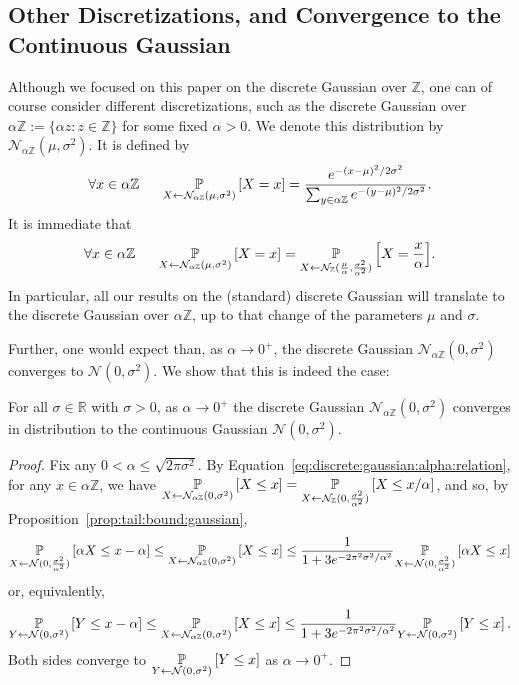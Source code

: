 \documentclass{jpc}
\newcommand{\discparamN}[1]{\mathcal{N}_{#1\Z}}
\newcommand{\pr}[2]{{\ifx&#1& \mathbb{P} \else
\underset{#1}{\mathbb{P}} \fi \left[#2\right]}}
\newcommand{\Z}{\mathbb{Z}}
\newcommand{\R}{\mathbb{R}}
\begin{document}
\subsection{Other Discretizations, and Convergence to the Continuous Gaussian}
\label{sec:other-discs}
Although we focused on this paper on the discrete Gaussian over $\Z$, one can of course consider different discretizations, such as the discrete Gaussian over $\alpha\Z := \{\alpha z : z \in \Z \}$ for some fixed $\alpha>0$. We denote this distribution by $\discparamN{\alpha}(\mu,\sigma^2)$. It is defined by
\begin{equation}
\forall x \in \alpha\Z ~~~~~ \pr{X \gets \discparamN{\alpha}(\mu,\sigma^2)}{X=x}=\frac{e^{-(x-\mu)^2/2\sigma^2}}{\sum_{y \in \alpha\Z} e^{-(y-\mu)^2/2\sigma^2}}.
\end{equation}
It is immediate that
\begin{equation}\label{eq:discrete:gaussian:alpha:relation}
\forall x \in \alpha\Z ~~~~~ \pr{X \gets \discparamN{\alpha}(\mu,\sigma^2)}{X=x}=\pr{X \gets \discN(\frac{\mu}{\alpha}, \frac{\sigma^2}{\alpha^2})}{X=\frac{x}{\alpha}}.
\end{equation}
 In particular, all our results on the (standard) discrete Gaussian will translate to the discrete Gaussian over $\alpha\Z$, up to that change of the parameters $\mu$ and $\sigma$.
 
 Further, one would expect than, as $\alpha \to 0^+$, the discrete Gaussian $\discparamN{\alpha}(0,\sigma^2)$ converges to $\mathcal{N}(0,\sigma^2)$. We show that this is indeed the case:
 \begin{prop}
    For all $\sigma \in \R$ with $\sigma>0$, as $\alpha \to 0^+$ the discrete Gaussian $\discparamN{\alpha}(0,\sigma^2)$ converges in distribution to the continuous Gaussian $\mathcal{N}(0,\sigma^2)$.
 \end{prop}
 \begin{proof}
 Fix any $0 < \alpha \leq \sqrt{2\pi\sigma^2}$. By Equation~\ref{eq:discrete:gaussian:alpha:relation}, for any $x \in \alpha\Z$, we have
 $
      \pr{X \gets \discparamN{\alpha}(0,\sigma^2)}{X\leq x}  = \pr{X \gets \discN(0, \frac{\sigma^2}{\alpha^2})}{X\leq x/\alpha }  
 $, and so, by Proposition~\ref{prop:tail:bound:gaussian},
 \[
         \pr{X \gets \mathcal{N}(0,\frac{\sigma^2}{\alpha^2})}{\alpha X \leq x-\alpha} \leq \pr{X \gets \discparamN{\alpha}(0,\sigma^2)}{X\leq x} \leq \frac{1}{1+3e^{-2\pi^2\sigma^2/\alpha^2}}\pr{X \gets \mathcal{N}(0,\frac{\sigma^2}{\alpha^2})}{\alpha X \le x}
 \]
 or, equivalently,
 \[
         \pr{Y \gets \mathcal{N}(0,\sigma^2)}{Y \leq x-\alpha} \leq \pr{X \gets \discparamN{\alpha}(0,\sigma^2)}{X\leq x} \leq \frac{1}{1+3e^{-2\pi^2\sigma^2/\alpha^2}}\pr{Y \gets \mathcal{N}(0,\sigma^2)}{Y \le x}\,.
 \]
 Both sides converge to $\pr{Y \gets \mathcal{N}(0,\sigma^2)}{Y \leq x}$ as $\alpha \to 0^+$. \end{proof}
  
\end{document}
